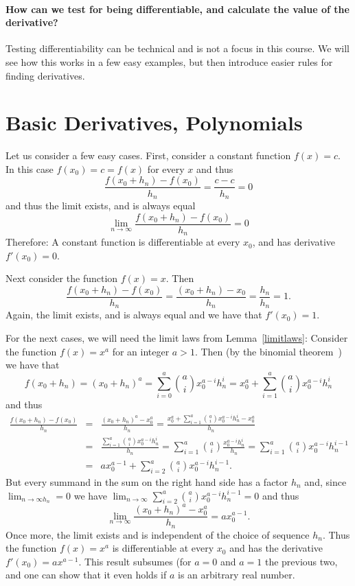 \paragraph{How can we test for being differentiable,
and calculate the value of the derivative?}
Testing differentiability can be technical and is not a focus in this
course. We will see how this works in a few easy examples, but then
introduce easier rules for finding derivatives.

\section{Basic Derivatives, Polynomials}
\label{secderpol}

Let us consider a few easy cases. First, consider a constant function
$f(x)=c$. In this case $f(x_0)=c=f(x)$ for every $x$ and thus
\[
\frac{f(x_0+h_n)-f(x_0)}{h_n} =\frac{c-c}{h_n}=0
\]
and thus the limit exists, and is always equal
\[
\lim_{n\to\infty} \frac{f(x_0+h_n)-f(x_0)}{h_n}=0
\]
Therefore: A constant function is differentiable at every $x_0$, and has
derivative $f'(x_0)=0$.

Next consider the function $f(x)=x$. Then
\[
\frac{f(x_0+h_n)-f(x_0)}{h_n} =\frac{(x_0+h_n)-x_0}{h_n}=\frac{h_n}{h_n}=1.
\]
Again, the limit exists, and is always equal and we have that
$f'(x_0)=1$.

For the next cases, we will need the limit laws from
Lemma~\ref{limitlaws}: Consider the function $f(x)=x^a$ for an integer
$a>1$. Then (by the binomial theorem~) we
have that 
\[
f(x_0+h_n)=(x_0+h_n)^a=\sum_{i=0}^a {a\choose i} x_0^{a-i} h_n^i
=x_0^a+\sum_{i=1}^{a} {a\choose i} x_0^{a-i} h_n^i
\]
and thus
\begin{eqnarray*}
\frac{f(x_0+h_n)-f(x_0)}{h_n}&=&\frac{(x_0+h_n)^a-x_0^a}{h_n}
=\frac{x_0^a+\sum_{i=1}^{a} {a\choose i} x_0^{a-i} h_n^i-x_0^a}{h_n}\\
&=&\frac{\sum_{i=1}^{a} {a\choose i} x_0^{a-i} h_n^{i}}{h_n}
=\sum_{i=1}^{a} {a\choose i} \frac{x_0^{a-i} h_n^{i}}{h_n}
=\sum_{i=1}^{a} {a\choose i} x_0^{a-i} h_n^{i-1}\\
&=&a x_0^{a-1}+\sum_{i=2}^a{a\choose i} x_0^{a-i} h_n^{i-1}.
\end{eqnarray*}
But every summand in the sum on the right hand side has a factor $h_n$ and,
since $\lim_{n\to\infty h_n}=0$ we have 
$\lim_{n\to\infty}\sum_{i=2}^a{a\choose i} x_0^{a-i} h_n^{i-1}=0$ and thus
\[
\lim_{n\to\infty}\frac{(x_0+h_n)^a-x_0^a}{h_n}=a x_0^{a-1}.
\]
Once more, the limit exists and is independent of the choice of sequence
$h_n$. Thus the function $f(x)=x^a$ is differentiable at every $x_0$ and has
the derivative $f'(x_0)=a x^{a-1}$. This result subsumes (for $a=0$ and
$a=1$ the previous two, and one can show that it even holds if $a$ is an
arbitrary real number.
\smallskip

